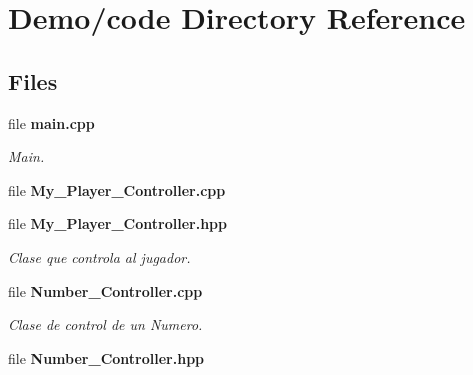 \section{Demo/code Directory Reference}
\label{dir_ab40d05e6bc8d872f1dcb58bcd7e0605}
\subsection*{Files}
\begin{DoxyCompactItemize}
\item 
file \textbf{ main.\+cpp}
\begin{DoxyCompactList}\small\item\em Main. \end{DoxyCompactList}\item 
file \textbf{ My\+\_\+\+Player\+\_\+\+Controller.\+cpp}
\item 
file \textbf{ My\+\_\+\+Player\+\_\+\+Controller.\+hpp}
\begin{DoxyCompactList}\small\item\em Clase que controla al jugador. \end{DoxyCompactList}\item 
file \textbf{ Number\+\_\+\+Controller.\+cpp}
\begin{DoxyCompactList}\small\item\em Clase de control de un Numero. \end{DoxyCompactList}\item 
file \textbf{ Number\+\_\+\+Controller.\+hpp}
\end{DoxyCompactItemize}
